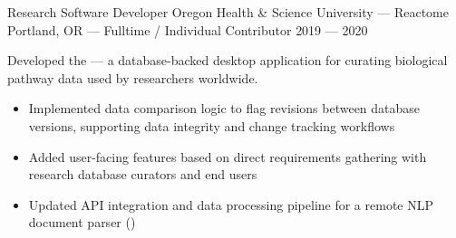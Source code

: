 \vspace*{\baselineskip}

\showoff
{Research Software Developer}
{Oregon Health \& Science University --- Reactome}
{Portland, OR --- Fulltime / Individual Contributor}
{2019 --- 2020}

Developed the  --- a database-backed desktop application for curating biological pathway data used by researchers worldwide.

\begin{itemize}
    \item Implemented data comparison logic to flag revisions between database versions, supporting data integrity and change tracking workflows
    \item Added user-facing features based on direct requirements gathering with research database curators and end users
    \item Updated API integration and data processing pipeline for a remote NLP document parser ()
\end{itemize}





\vfill \myBreak{}


